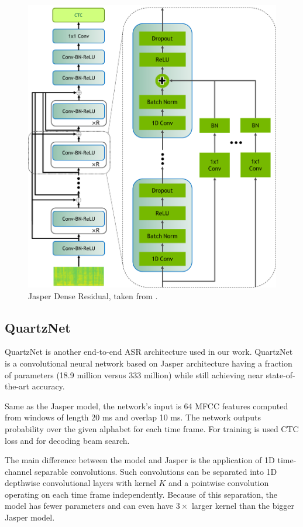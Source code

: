 \begin{figure}[h]
	\centering
	\includegraphics[scale=0.7]{img/JasperVerticalDR4.png}
	\caption{Jasper Dense Residual, taken from .}
	\label{fig:jasper_dr}
\end{figure}

\subsection{QuartzNet}
\label{intro:quartznet}

QuartzNet  is another end-to-end ASR architecture used in our work. QuartzNet is a convolutional neural network based on Jasper  architecture having a fraction of parameters (18.9 million versus 333 million) while still achieving near state-of-the-art accuracy.

Same as the Jasper model, the network's input is 64 MFCC features computed from windows of length 20 ms and overlap 10 ms. The network outputs probability over the given alphabet for each time frame. For training is used CTC loss and for decoding beam search.

The main difference between the model and Jasper is the application of 1D time-channel separable convolutions.  Such convolutions can be separated into 1D depthwise convolutional layers with kernel $K$ and a pointwise convolution operating on each time frame independently. Because of this separation, the model has fewer parameters and can even have $3 \times$ larger kernel than the bigger Jasper model.


